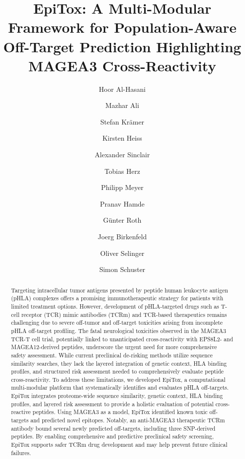 \documentclass[times, twoside, watermark]{zHenriquesLab-StyleBioRxiv}
\begin{document}
\title{EpiTox: A Multi-Modular Framework for Population-Aware Off-Target Prediction Highlighting MAGEA3 Cross-Reactivity}

\author[1]{Hoor Al-Hasani} \author[1]{Mazhar Ali} \author[1]{Stefan Krämer} \author[1]{Kirsten Heiss} \author[1]{Alexander Sinclair} \author[1]{Tobias Herz} \author[1]{Philipp Meyer} \author[1]{Pranav Hamde} \author[2]{Günter Roth} \author[2]{Joerg Birkenfeld} \author[1]{Oliver Selinger} \author[1, \Letter]{Simon Schuster}


\maketitle

\begin{abstract}
    Targeting intracellular tumor antigens presented by peptide human leukocyte antigen (pHLA) complexes offers a promising immunotherapeutic strategy for patients with limited treatment options. However, development of pHLA-targeted drugs such as T-cell receptor (TCR) mimic antibodies (TCRm) and TCR-based therapeutics remains challenging due to severe off-tumor and off-target toxicities arising from incomplete pHLA off-target profiling. The fatal neurological toxicities observed in the MAGEA3 TCR-T cell trial, potentially linked to unanticipated cross-reactivity with EPS8L2- and MAGEA12-derived peptides, underscore the urgent need for more comprehensive safety assessment. While current preclinical de-risking methods utilize sequence similarity searches, they lack the layered integration of genetic context, HLA binding profiles, and structured risk assessment needed to comprehensively evaluate peptide cross-reactivity. To address these limitations, we developed EpiTox, a computational multi-modular platform that systematically identifies and evaluates pHLA off-targets. EpiTox integrates proteome-wide sequence similarity, genetic context, HLA binding profiles, and layered risk assessment to provide a holistic evaluation of potential cross-reactive peptides. Using MAGEA3 as a model, EpiTox identified known toxic off-targets and predicted novel epitopes. Notably, an anti-MAGEA3 therapeutic TCRm antibody bound several newly predicted off-targets, including three SNP-derived peptides. By enabling comprehensive and predictive preclinical safety screening, EpiTox supports safer TCRm drug development and may help prevent future clinical failures.
\end {abstract}
\end{document}
